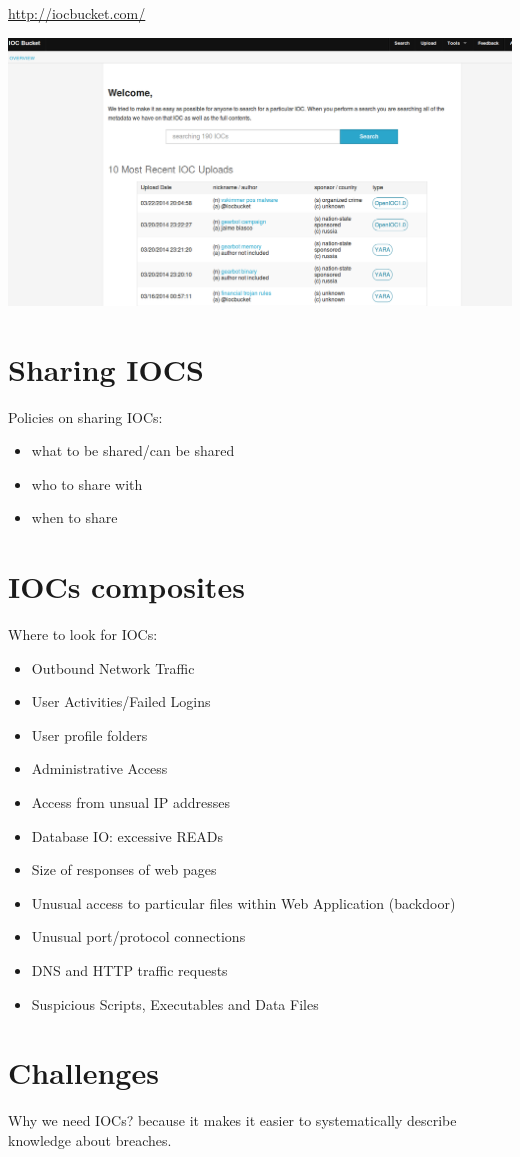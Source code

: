 \documentclass[11pt]{article}
\begin{document}
\url{http://iocbucket.com/}

\includegraphics[width=.9\linewidth]{images/iocbucket.png}
\section*{Sharing IOCS}
\label{sec-7}

Policies on sharing IOCs:

\begin{itemize}
\item what to be shared/can be shared
\item who to share with
\item when to share
\end{itemize}
\section*{IOCs composites}
\label{sec-8}
Where to look for IOCs:
\begin{itemize}
\item Outbound Network Traffic
\item User Activities/Failed Logins
\item User profile folders
\item Administrative Access
\item Access from unsual IP addresses
\item Database IO: excessive READs
\item Size of responses of web pages
\item Unusual access to particular files within Web Application (backdoor)
\item Unusual port/protocol connections
\item DNS and HTTP traffic requests
\item Suspicious Scripts, Executables and Data Files
\end{itemize}
\section*{Challenges}
\label{sec-9}
Why we need IOCs? because it makes it easier to
systematically describe knowledge about breaches.
\end{document}
